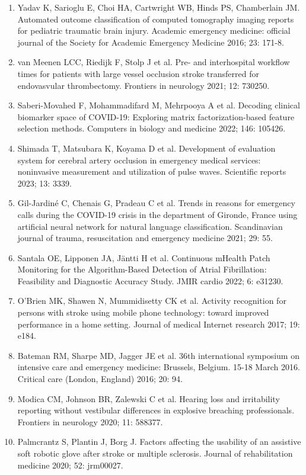 {{\begin{enumerate}
    \item Yadav K, Sarioglu E, Choi HA, Cartwright WB, Hinds PS, Chamberlain JM. Automated outcome classification of computed tomography imaging reports for pediatric traumatic brain injury. Academic emergency medicine: official journal of the Society for Academic Emergency Medicine 2016; 23: 171-8.
    \item van Meenen LCC, Riedijk F, Stolp J et al. Pre- and interhospital workflow times for patients with large vessel occlusion stroke transferred for endovasvular thrombectomy. Frontiers in neurology 2021; 12: 730250.
    \item Saberi-Movahed F, Mohammadifard M, Mehrpooya A et al. Decoding clinical biomarker space of COVID-19: Exploring matrix factorization-based feature selection methods. Computers in biology and medicine 2022; 146: 105426.
    \item Shimada T, Matsubara K, Koyama D et al. Development of evaluation system for cerebral artery occlusion in emergency medical services: noninvasive measurement and utilization of pulse waves. Scientific reports 2023; 13: 3339.
    \item Gil-Jardiné C, Chenais G, Pradeau C et al. Trends in reasons for emergency calls during the COVID-19 crisis in the department of Gironde, France using artificial neural network for natural language classification. Scandinavian journal of trauma, resuscitation and emergency medicine 2021; 29: 55.
    \item Santala OE, Lipponen JA, Jäntti H et al. Continuous mHealth Patch Monitoring for the Algorithm-Based Detection of Atrial Fibrillation: Feasibility and Diagnostic Accuracy Study. JMIR cardio 2022; 6: e31230.
    \item O'Brien MK, Shawen N, Mummidisetty CK et al. Activity recognition for persons with stroke using mobile phone technology: toward improved performance in a home setting. Journal of medical Internet research 2017; 19: e184.
    \item Bateman RM, Sharpe MD, Jagger JE et al. 36th international symposium on intensive care and emergency medicine: Brussels, Belgium. 15-18 March 2016. Critical care (London, England) 2016; 20: 94.
    \item Modica CM, Johnson BR, Zalewski C et al. Hearing loss and irritability reporting without vestibular differences in explosive breaching professionals. Frontiers in neurology 2020; 11: 588377.
    \item Palmcrantz S, Plantin J, Borg J. Factors affecting the usability of an assistive soft robotic glove after stroke or multiple sclerosis. Journal of rehabilitation medicine 2020; 52: jrm00027.

\end{enumerate}}}
